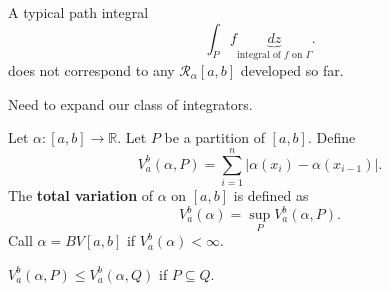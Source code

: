 \documentclass[letterpaper, reqno,11pt]{article}
\newcommand{\RR}{\mathbb{R}}
\begin{document}
 A typical path integral
$$ \int_P f\underbrace{dz}_\text{integral of $f$ on $\Gamma$}. $$
does not correspond to any $\mathcal R_\alpha[a, b]$ developed so far.

\medskip

\noindent Need to expand our class of integrators.

\begin{defn}
  \normalfont Let $\alpha : [a, b] \to \RR$. Let $P$ be a partition of $[a, b]$. Define
  $$ V_a^b (\alpha, P) = \sum_{i = 1}^n |\alpha(x_i) - \alpha(x_{i - 1})|. $$
  The {\bf total variation} of $\alpha$ on $[a, b]$ is defined as
  $$ V_a^b (\alpha) = \sup_P V_a^b (\alpha, P). $$
  Call $\alpha = BV[a, b]$ if $V_a^b (\alpha) < \infty$.
\end{defn}

 $V_a^b (\alpha, P) \leq V_a^b (\alpha, Q)$ if $P \subseteq Q$.
\end{document}
